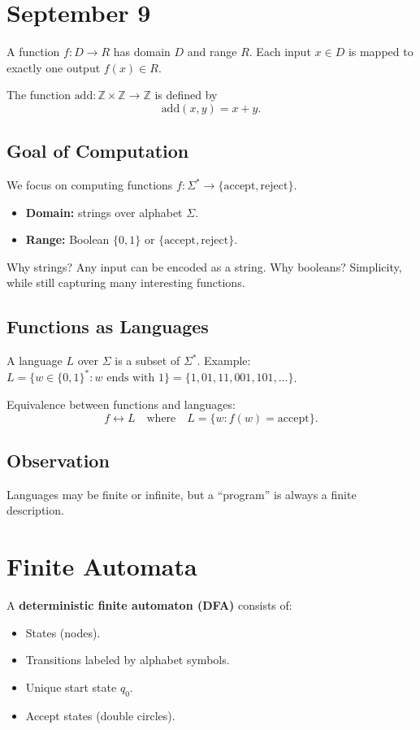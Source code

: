 \section{September 9}

\begin{definition}
A function $f : D \to R$ has domain $D$ and range $R$. Each input $x \in D$ is mapped to exactly one output $f(x) \in R$.
\end{definition}

\begin{example}
The function $\text{add} : \mathbb{Z} \times \mathbb{Z} \to \mathbb{Z}$ is defined by
\[
\text{add}(x,y) = x + y.
\]
\end{example}

\subsection*{Goal of Computation}
We focus on computing functions $f : \Sigma^* \to \{\text{accept}, \text{reject}\}$.
\begin{itemize}
    \item \textbf{Domain:} strings over alphabet $\Sigma$.
    \item \textbf{Range:} Boolean $\{0,1\}$ or $\{\text{accept}, \text{reject}\}$.
\end{itemize}

Why strings? Any input can be encoded as a string.  
Why booleans? Simplicity, while still capturing many interesting functions.

\subsection*{Functions as Languages}
A language $L$ over $\Sigma$ is a subset of $\Sigma^*$.  
Example: $L = \{ w \in \{0,1\}^* : w \text{ ends with } 1\} = \{1, 01, 11, 001, 101, \dots\}$.

Equivalence between functions and languages:
\[
f \leftrightarrow L \quad \text{where} \quad
L = \{w : f(w) = \text{accept}\}.
\]

\subsection*{Observation}
Languages may be finite or infinite, but a ``program'' is always a finite description.

\section*{Finite Automata}
A \textbf{deterministic finite automaton (DFA)} consists of:
\begin{itemize}
    \item States (nodes).
    \item Transitions labeled by alphabet symbols.
    \item Unique start state $q_0$.
    \item Accept states (double circles).
\end{itemize}

